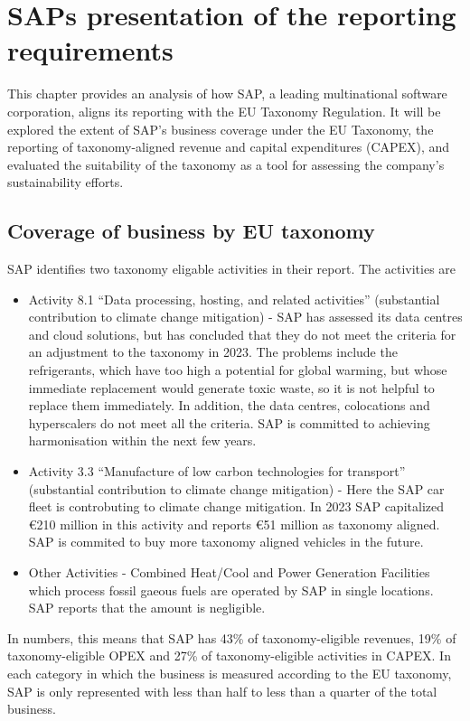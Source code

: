 \chapter{SAPs presentation of the reporting requirements}
This chapter provides an analysis of how SAP, a leading multinational software corporation, aligns its reporting with the EU Taxonomy Regulation. It will be explored the extent of SAP's business coverage under the EU Taxonomy, the reporting of taxonomy-aligned revenue and capital expenditures (CAPEX), and evaluated the suitability of the taxonomy as a tool for assessing the company's sustainability efforts.
\section{Coverage of business by EU taxonomy}
SAP identifies two taxonomy eligable activities in their report. The activities are 
\begin{itemize}
    \item Activity 8.1 “Data processing, hosting, and related activities” (substantial contribution to climate change mitigation) - SAP has assessed its data centres and cloud solutions, but has concluded that they do not meet the criteria for an adjustment to the taxonomy in 2023. The problems include the refrigerants, which have too high a potential for global warming, but whose immediate replacement would generate toxic waste, so it is not helpful to replace them immediately. In addition, the data centres, colocations and hyperscalers do not meet all the criteria. SAP is committed to achieving harmonisation within the next few years.
    \item Activity 3.3 “Manufacture of low carbon technologies for transport” (substantial contribution to climate change mitigation) - Here the SAP car fleet is controbuting to climate change mitigation. In 2023 SAP capitalized €210 million in this activity and reports €51 million as taxonomy aligned. SAP is commited to buy more taxonomy aligned vehicles in the future.
    \item Other Activities - Combined Heat/Cool and Power Generation Facilities which process fossil gaeous fuels are operated by SAP in single locations. SAP reports that the amount is negligible.
\end{itemize}
In numbers, this means that SAP has 43\% of taxonomy-eligible revenues, 19\% of taxonomy-eligible \ac{OPEX} and 27\% of taxonomy-eligible activities in \ac{CAPEX}.  In each category in which the business is measured according to the EU taxonomy, SAP is only represented with less than half to less than a quarter of the total business.
\autocites[Cf.][92-98]{sapreport}


